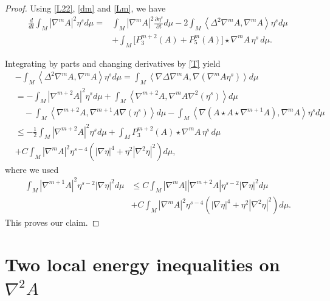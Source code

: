 \documentclass{amsart}
\theoremstyle{definition}
\numberwithin{equation}{section}
\begin{document}
\begin{proof}
 Using \eqref{L22}, \eqref{dm} and  \eqref{Lm}, we have
\begin{align*}
 \frac{d}{dt} \int_{M}   \left| \nabla^{m} A \right|^{2} \eta^sd\mu
  = &  \int_{M}   \left| \nabla^{m} A \right|^{2}  \frac{\partial \eta^s}{\partial t} d\mu  - 2\int_{M} \left < \Delta^2 \nabla^{m} A,
  \nabla^{m} A\right > \eta^s d\mu \\
  & + \int_{M}   \Big[ P_{3}^{m+2}(A)+ P_{5}^{m}(A)\Big] \star \nabla^{m} A \,\eta^s\, d\mu.
\end{align*}



Integrating by parts and changing derivatives by \eqref{T} yield
\begin{align*}
 &-\int_{M} \left < \Delta^2 \nabla^{m} A, \nabla^{m} A\right > \eta^s d\mu =\int_{M} \left < \nabla\Delta \nabla^{m} A, \nabla (\nabla^{m}
 A\eta^s )\right > d\mu \\
  & =-\int_{M} | \nabla^{m+2} A|^2 \eta^s d\mu + \int_{M} \left <  \nabla^{m+2} A, \nabla^{m} A\nabla^2 (\eta^s )\right >d\mu \\
  &\quad -\int_{M} \left <  \nabla^{m+2} A, \nabla^{m+1} A\nabla  (\eta^s )\right > d\mu
  -\int_{M} \left <\nabla ( A\star A\star \nabla^{m+1} A), \nabla^{m} A\right > \eta^s d\mu
  \\
  &\leq -\frac  12   \int_{M} | \nabla^{m+2} A|^2 \eta^s d\mu  + \int_{M}    P_{3}^{m+2}(A) \star \nabla^{m} A \,\eta^s\, d\mu \\
  & +C \int_{M} \left| \nabla^m A \right|^{2}  \eta^{s-4} \left( \left| \nabla  \eta \right|^{4} +  \eta^2 \left| \nabla^{2} \eta
  \right|^{2} \right) d\mu,
\end{align*}
where we used
\begin{align*}
 \int_{M} | \nabla^{m+1} A|^2 \eta^{s-2}|\nabla \eta|^2 d\mu
 &\leq C \int_{M} | \nabla^{m} A| |\nabla^{m+2} A|  \eta^{s-2}|\nabla \eta|^2 d\mu\\ &+C \int_{M} \left| \nabla^m A \right|^{2}  \eta^{s-4}
 \left( \left| \nabla  \eta \right|^{4} +  \eta^2 \left| \nabla^{2} \eta
  \right|^{2} \right) d\mu .
\end{align*}
This proves our claim.
\end{proof}






\section{Two local energy inequalities on $\nabla^2A$} \label{S:energy}
\end{document}
